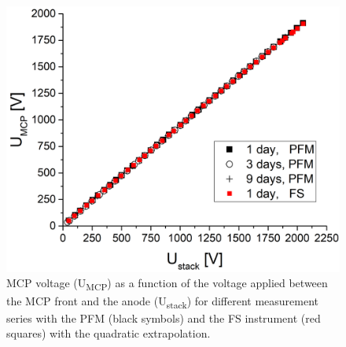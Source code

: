 	\begin{figure}[h!] %
		\centering
		\includegraphics[width=.8\textwidth]{Experiments/PFM_UstackUmccp_TimeEvol.png}
		\caption{MCP voltage (U\textsubscript{MCP}) as a function of the voltage applied between the MCP front and the anode (U\textsubscript{stack}) for different measurement series with the PFM (black symbols) and the FS instrument (red squares) with the quadratic extrapolation.}
		\label{fig:PFMUstackUmcpTimeEvol}
	\end{figure} %

